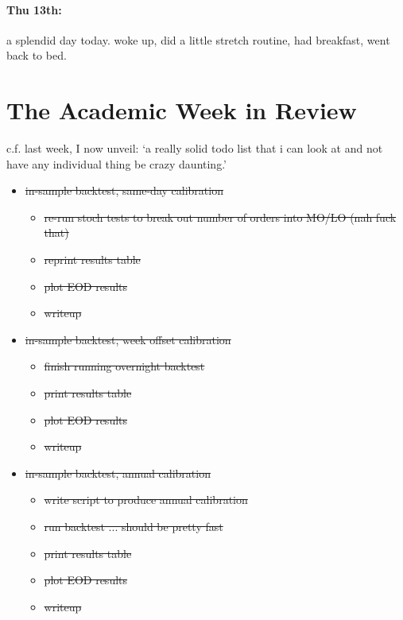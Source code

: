 \documentclass[12pt]{article}
\begin{document}
\paragraph{Thu 13th:} a splendid day today. woke up, did a little stretch routine, had breakfast, went back to bed. 

\section*{The Academic Week in Review}
c.f. last week, I now unveil: `a really solid todo list that i can look at and not have any individual thing be crazy daunting.'

\clearpage 

\begin{itemize}[topsep=0pt,itemsep=0ex,partopsep=0ex,parsep=0ex]
\item \st{in-sample backtest, same-day calibration}
\begin{itemize}[topsep=0pt,itemsep=0ex,partopsep=0ex,parsep=0ex]
\item \st{re-run stoch tests to break out number of orders into MO/LO (nah fuck that)}
\item \st{reprint results table}
\item \st{plot EOD results}
\item \st{writeup}
\end{itemize}

\item \st{in-sample backtest, week offset calibration}
\begin{itemize}[topsep=0pt,itemsep=0ex,partopsep=0ex,parsep=0ex]
\item \st{finish running overnight backtest}
\item \st{print results table}
\item \st{plot EOD results}
\item \st{writeup}
\end{itemize}

\item \st{in-sample backtest, annual calibration}
\begin{itemize}[topsep=0pt,itemsep=0ex,partopsep=0ex,parsep=0ex]
\item \st{write script to produce annual calibration}
\item \st{run backtest ... should be pretty fast}
\item \st{print results table}
\item \st{plot EOD results}
\item \st{writeup}
\end{itemize}


\end{itemize}
\end{document}
